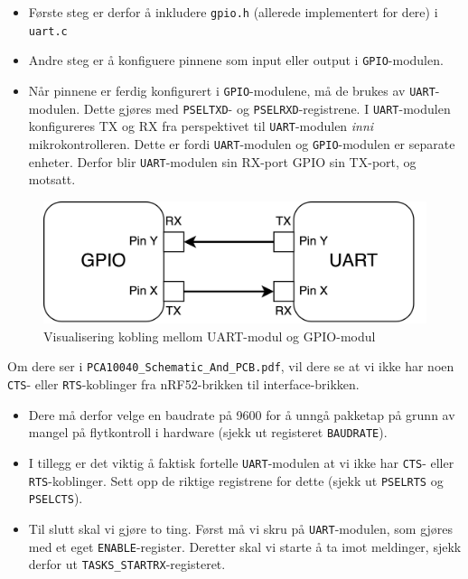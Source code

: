 \begin{itemize}
    \item Første steg er derfor å inkludere \verb|gpio.h| (allerede implementert for dere) i \verb|uart.c|
    \item Andre steg er å konfiguere pinnene som input eller output i \verb|GPIO|-modulen.
    \item Når pinnene er ferdig konfigurert i \verb|GPIO|-modulene, må de brukes av \verb|UART|-modulen. Dette gjøres med \verb|PSELTXD|- og \verb|PSELRXD|-registrene. I \verb|UART|-modulen konfigureres TX og RX fra perspektivet til \verb|UART|-modulen {\it inni} mikrokontrolleren. Dette er fordi \verb|UART|-modulen og \verb|GPIO|-modulen er separate enheter. Derfor blir \verb|UART|-modulen sin RX-port GPIO sin TX-port, og motsatt. 
\end{itemize}

\begin{figure}[ht]
    \centering
    \includegraphics[scale=0.20]{figures/UART_PINS.png}
    \caption{Visualisering kobling mellom UART-modul og GPIO-modul}
    \label{fig:uart_and_gpio}
\end{figure}



Om dere ser i \verb|PCA10040_Schematic_And_PCB.pdf|, vil dere se at vi ikke har noen \verb|CTS|- eller \verb|RTS|-koblinger fra nRF52-brikken til interface-brikken. 

\begin{itemize}
    \item Dere må derfor velge en baudrate på 9600 for å unngå pakketap på grunn av mangel på flytkontroll i hardware (sjekk ut registeret \verb|BAUDRATE|).
    \item I tillegg er det viktig å faktisk fortelle \verb|UART|-modulen at vi ikke har \verb|CTS|- eller \verb|RTS|-koblinger. Sett opp de riktige registrene for dette (sjekk ut \verb|PSELRTS| og \verb|PSELCTS|).
    \item 

Til slutt skal vi gjøre to ting. Først må vi skru på \verb|UART|-modulen, som gjøres med et eget \verb|ENABLE|-register. Deretter skal vi starte å ta imot meldinger, sjekk derfor ut \verb|TASKS_STARTRX|-registeret. 
\end{itemize}







